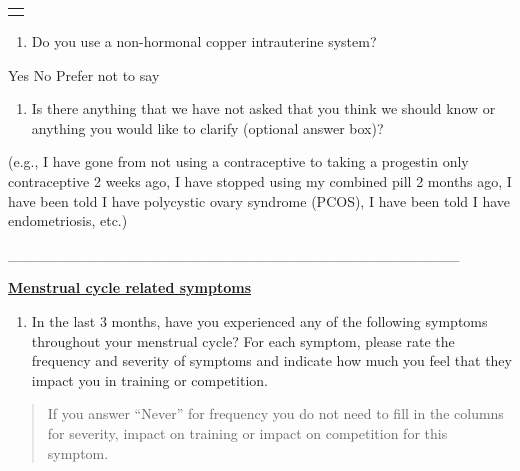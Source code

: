 \begin{longtable}[]{@{}
  >{\raggedright\arraybackslash}p{}@{}}
\toprule\noalign{}
\begin{minipage}[b]{\linewidth}\raggedright
\end{minipage} \\
\midrule\noalign{}
\endhead
\bottomrule\noalign{}
\endlastfoot
\end{longtable}

\begin{enumerate}
\def\labelenumi{\arabic{enumi})}
\setcounter{enumi}{7}
\item
  Do you use a non-hormonal copper intrauterine system?
\end{enumerate}

Yes No Prefer not to say

\begin{enumerate}
\def\labelenumi{\arabic{enumi})}
\setcounter{enumi}{8}
\item
  Is there anything that we have not asked that you think we should know
  or anything you would like to clarify (optional answer box)?
\end{enumerate}

(e.g., I have gone from not using a contraceptive to taking a progestin
only contraceptive 2 weeks ago, I have stopped using my combined pill 2
months ago, I have been told I have polycystic ovary syndrome (PCOS), I
have been told I have endometriosis, etc.)

\_\_\_\_\_\_\_\_\_\_\_\_\_\_\_\_\_\_\_\_\_\_\_\_\_\_\_\_\_\_\_\_\_\_\_\_\_\_\_\_\_\_\_

\textbf{\underline{Menstrual cycle related symptoms}}

\begin{enumerate}
\def\labelenumi{\arabic{enumi})}
\setcounter{enumi}{9}
\item
  In the last 3 months, have you experienced any of the following
  symptoms throughout your menstrual cycle? For each symptom, please
  rate the frequency and severity of symptoms and indicate how much you
  feel that they impact you in training or competition.
\end{enumerate}

\begin{quote}
If you answer ``Never'' for frequency you do not need to fill in the
columns for severity, impact on training or impact on competition for
this symptom.
\end{quote}

